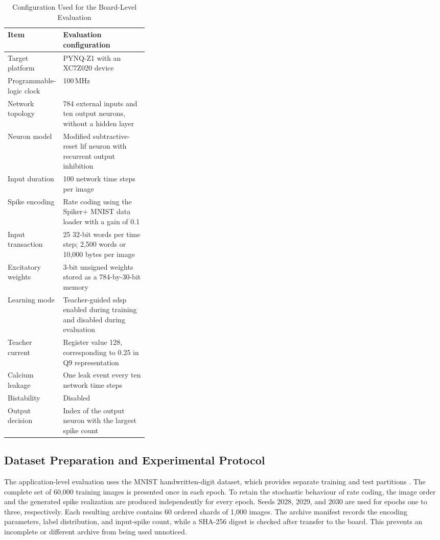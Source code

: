 \begin{table}[htbp]
	\centering
	\caption{Configuration Used for the Board-Level Evaluation}
	\label{tab:evaluation-configuration}
	\small
	\begin{tabularx}{\linewidth}{@{}p{0.32\linewidth}X@{}}
		\toprule
		\textbf{Item} & \textbf{Evaluation configuration} \\
		\midrule
		Target platform & PYNQ-Z1 with an XC7Z020 device \\
		Programmable-logic clock & 100\,MHz \\
		Network topology & 784 external inputs and ten output neurons, without a hidden layer \\
		Neuron model & Modified subtractive-reset \gls{lif} neuron with recurrent output inhibition \\
		Input duration & 100 network time steps per image \\
		Spike encoding & Rate coding using the Spiker+ MNIST data loader with a gain of 0.1 \\
		Input transaction & 25 32-bit words per time step; 2,500 words or 10,000 bytes per image \\
		Excitatory weights & 3-bit unsigned weights stored as a 784-by-30-bit memory \\
		Learning mode & Teacher-guided \gls{sdsp} enabled during training and disabled during evaluation \\
		Teacher current & Register value 128, corresponding to 0.25 in Q9 representation \\
		Calcium leakage & One leak event every ten network time steps \\
		Bistability & Disabled \\
		Output decision & Index of the output neuron with the largest spike count \\
		\bottomrule
	\end{tabularx}
\end{table}

\subsection{Dataset Preparation and Experimental Protocol}

The application-level evaluation uses the MNIST handwritten-digit dataset, which provides separate training and test partitions \cite{LeCun1998GradientBasedLearning}. The complete set of 60,000 training images is presented once in each epoch. To retain the stochastic behaviour of rate coding, the image order and the generated spike realization are produced independently for every epoch. Seeds 2028, 2029, and 2030 are used for epochs one to three, respectively. Each resulting archive contains 60 ordered shards of 1,000 images. The archive manifest records the encoding parameters, label distribution, and input-spike count, while a SHA-256 digest is checked after transfer to the board. This prevents an incomplete or different archive from being used unnoticed.

